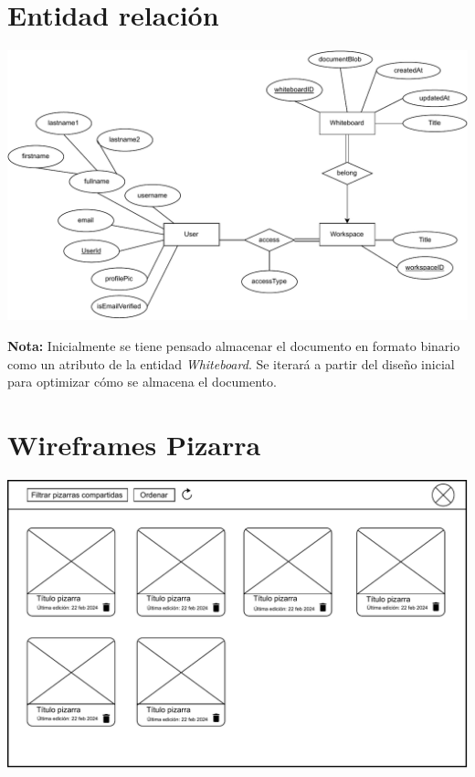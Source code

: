\documentclass[a4paper, oneside, final]{scrartcl}
\begin{document}
\section{Entidad relación}

\includegraphics[width=\textwidth]{images/Entidad-relacion.pdf}

\textbf{Nota:} Inicialmente se tiene pensado almacenar el documento en formato binario como un atributo de la entidad \textit{Whiteboard}. Se iterará a partir del diseño inicial para optimizar cómo se almacena el documento.

\section{Wireframes Pizarra}
\includegraphics[width= \textwidth]{images/WireframeListaPizarras.drawio.pdf}
\end{document}
